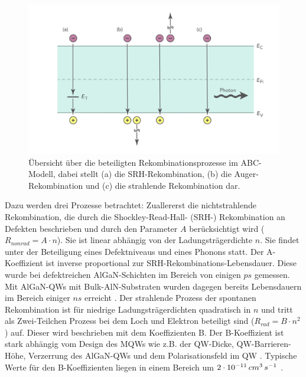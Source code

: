 %
\begin{figure}[h]
    \centering
    \begin{minipage}[t]{0.75\linewidth}
        \centering
        \includegraphics[width=\linewidth]{Bilder/rekbomChannels.png}
        \caption{Übersicht über die beteiligten Rekombinationsprozesse im ABC-Modell, dabei stellt (a) die SRH-Rekombination, (b) die Auger-Rekombination und (c) die strahlende Rekombination dar.}
        \label{fig:rekombChannels}
    \end{minipage}%
\end{figure}
\noindent
%
Dazu werden drei Prozesse betrachtet: Zuallererst die nichtstrahlende Rekombination, die durch die Shockley-Read-Hall- (SRH-) Rekombination an Defekten beschrieben und durch den Parameter $A$ berücksichtigt wird ($R_{nonrad} = A \cdot n $). Sie ist linear abhängig von der Ladungsträgerdichte $n$. Sie findet unter der Beteiligung eines Defektniveaus und eines Phonons statt. Der A-Koeffizient ist inverse proportional zur SRH-Rekombinations-Lebensdauer. Diese wurde bei defektreichen AlGaN-Schichten im Bereich von einigen $ps$ gemessen. Mit AlGaN-QWs mit Bulk-AlN-Substraten wurden dagegen bereits Lebensdauern im Bereich einiger $ns$ erreicht \cite{1882-0786-4-9-092101} \cite{doi:10.1002/pssc.201100424}.
\newline
Der strahlende Prozess der spontanen Rekombination ist für niedrige Ladungsträgerdichten quadratisch in $n$ und tritt als Zwei-Teilchen Prozess bei dem Loch und Elektron beteiligt sind ($R_{rad} = B \cdot n^2 $) auf. Dieser wird beschrieben mit dem Koeffizienten B. Der B-Koeffizient ist stark abhängig vom Design des MQWs wie z.B. der QW-Dicke, QW-Barrieren-Höhe, Verzerrung des AlGaN-QWs und dem Polarisationsfeld im QW \cite{kneissl}. Typische Werte für den B-Koeffizienten liegen in einem Bereich um $2 \cdot 10^{-11} \thinspace cm^3 \thinspace s^{-1}$ \cite{1882-0786-8-2-022104} \cite{1882-0786-4-5-052101}.  
